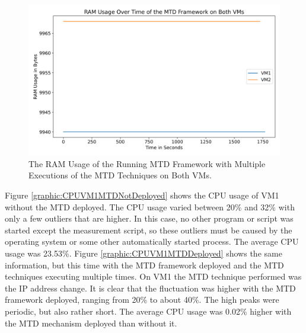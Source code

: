 \begin{figure}[tph]
\includegraphics[scale=0.65]{assets/RAMUSageBoth.png}
\centering
\caption{The RAM Usage of the Running MTD Framework with Multiple Executions of the MTD Techniques on Both VMs.}
\label{graphic:RAMUSageBoth}
\end{figure}


Figure \ref{graphic:CPUVM1MTDNotDeployed} shows the CPU usage of VM1 without the MTD deployed. The CPU usage varied between 20\% and 32\% with only a few outliers that are higher. In this case, no other program or script was started except the measurement script, so these outliers must be caused by the operating system or some other automatically started process. The average CPU usage was 23.53\%. Figure \ref{graphic:CPUVM1MTDDeployed} shows the same information, but this time with the MTD framework deployed and the MTD techniques executing multiple times. On VM1 the MTD technique performed was the IP address change. It is clear that the fluctuation was higher with the MTD framework deployed, ranging from 20\% to about 40\%. The high peaks were periodic, but also rather short. The average CPU usage was 0.02\% higher with the MTD mechanism deployed than without it. 

